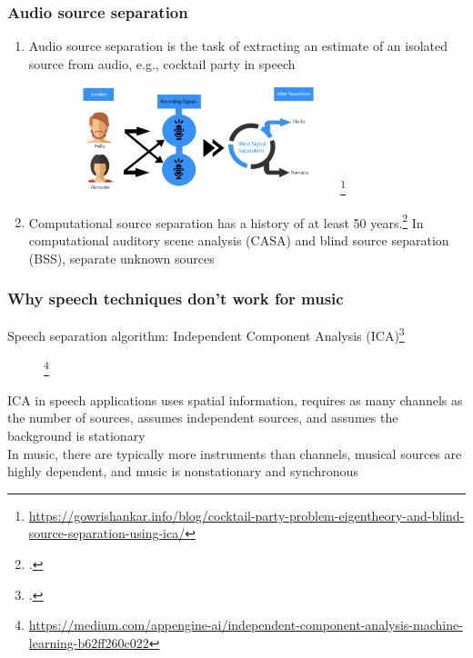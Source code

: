 \documentclass[usenames,dvipsnames]{beamer}
\begin{document}
\begin{frame}
	\frametitle{Audio source separation}
       \begin{enumerate}
               \item
                       Audio source separation is the task of extracting an estimate of an isolated source from audio, e.g., cocktail party in speech
		       \begin{figure}
		       \includegraphics[width=8cm]{./images-mila-presentation/bss.png}\footnote{\url{https://gowrishankar.info/blog/cocktail-party-problem-eigentheory-and-blind-source-separation-using-ica/}}
		       \vspace{-0.5em}
		       \end{figure}
	       \item
		       Computational source separation has a history of at least 50 years.\footcite{musicmask, musicsepintro1} In computational auditory scene analysis (CASA) and blind source separation (BSS), separate unknown sources
	              \end{enumerate}
\end{frame}

\begin{frame}
	\frametitle{Why speech techniques don't work for music}
       Speech separation algorithm: Independent Component Analysis (ICA)\footcite{musicsepintro1}
       \begin{figure}
	       \vspace{-1.25em}
	       \footnote{\url{https://medium.com/appengine-ai/independent-component-analysis-machine-learning-b62ff260c022}}
	       \vspace{-0.5em}
       \end{figure}
	ICA in speech applications uses spatial information, requires as many channels as the number of sources, assumes independent sources, and assumes the background is stationary\\
	\vspace{0.15em}
	In music, there are typically more instruments than channels, musical sources are highly dependent, and music is nonstationary and synchronous
\end{frame}
\end{document}
